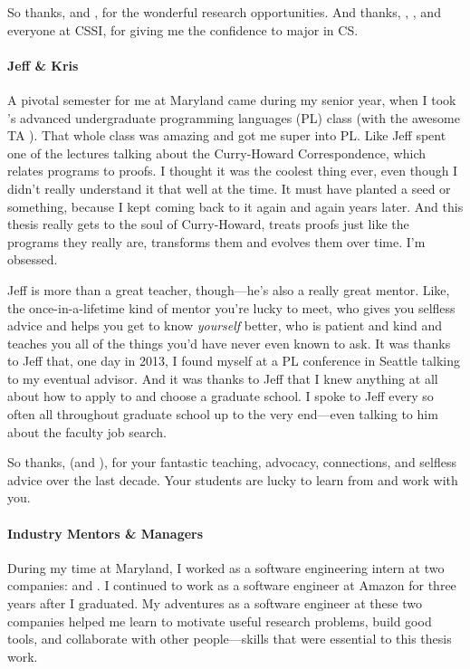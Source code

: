 So thanks,  and , for the wonderful research opportunities.
And thanks, , , and everyone at  CSSI, for giving me the confidence to major in CS.

\paragraph{Jeff \& Kris}
A pivotal semester for me at Maryland came during my senior year, when I took 's advanced undergraduate programming languages (PL) class
(with the awesome TA ).
That whole class was amazing and got me super into PL.
Like Jeff spent one of the lectures talking about the Curry-Howard Correspondence,
which relates programs to proofs.
I thought it was the coolest thing ever, even though I didn't really understand it that well at the time.
It must have planted a seed or something, because I kept coming back to it again and again years later.
And this thesis really gets to the soul of Curry-Howard, treats proofs just like the programs they really are,
transforms them and evolves them over time.
I'm obsessed.

Jeff is more than a great teacher, though---he's also a really great mentor.
Like, the once-in-a-lifetime kind of mentor you're lucky to meet, who gives you selfless advice and helps you get to know \textit{yourself} better,
who is patient and kind and teaches you all of the things you'd have never even known to ask.
It was thanks to Jeff that, one day in 2013, I found myself at a PL conference in Seattle talking to my eventual advisor.
And it was thanks to Jeff that I knew anything at all about how to apply to and choose a graduate school.
I spoke to Jeff every so often all throughout graduate school up to the very 
end---even talking to him about the faculty job search.

So thanks,  (and ), for your fantastic teaching, advocacy, connections, and selfless advice over the last decade.
Your students are lucky to learn from and work with you.

\paragraph{Industry Mentors \& Managers}
During my time at Maryland, I worked as a software engineering intern at two companies:
 and .
I continued to work as a software engineer at Amazon for three years after I graduated.
My adventures as a software engineer at these two companies helped me learn to motivate useful research problems,
build good tools, and collaborate with other people---skills that were essential to this thesis work.

